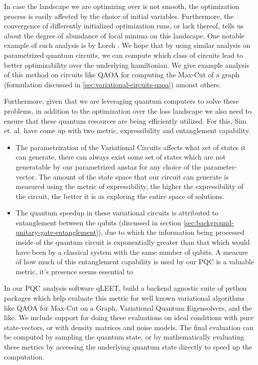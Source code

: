 In case the landscape we are optimizing over is not smooth, the optimization process is easily affected by the choice of initial variables. Furthermore, the convergence of differently initialized optimization runs, or lack thereof, tells us about the degree of abundance of local minima on this landscape. One notable example of such analysis is by Lorch \cite{training-trajectories}. We hope that by using similar analysis on parametrized quantum circuits, we can compute which class of circuits lead to better optimizability over the underlying hamiltonian. We give example analysis of this method on circuits like QAOA for computing the Max-Cut of a graph (formulation discussed in \ref{sec:variational-circuits-qaoa}) amonst others.

Furthermore, given that we are leveraging quantum computers to solve these problems, in addition to the optimization over the loss landscape we also need to ensure that these quantum resources are being efficiently utilized. For this, Sim et. al. \cite{expressibility-entanglability-guzik} have come up with two metric, expressibility and entanglement capability. 
\begin{itemize}
    \item The parametrization of the Variational Circuits affects what set of states it can generate, there can always exist some set of states which are not generatable by our parametrized anstaz for any choice of the parameter-vector. The amount of the state space that our circuit can generate is measured using the metric of expressibility, the higher the expressibility of the circuit, the better it is as exploring the entire space of solutions.  
    \item The quantum speedup in these variational circuits is attributed to entanglement between the qubits (discussed in section \ref{sec:background-unitary-gate-entanglement}), due to which the information being processed inside of the quantum circuit is exponentially greater than that which would have been by a classical system with the same number of qubits. A measure of how much of this entanglement capability is used by our PQC is a valuable metric, it's presence seems essential to 
\end{itemize}

In our PQC analysis software qLEET, build a backend agnostic suite of python packages which help evaluate this metric for well known variational algorithms like QAOA for Max-Cut on a Graph, Variational Quantum Eigensolvers, and the like. We include support for doing these evaluations on ideal conditions with pure state-vectors, or with density matrices and noise models. The final evaluation can be computed by sampling the quantum state, or by mathematically evaluating these metrics by accessing the underlying quantum state directly to speed up the computation.


